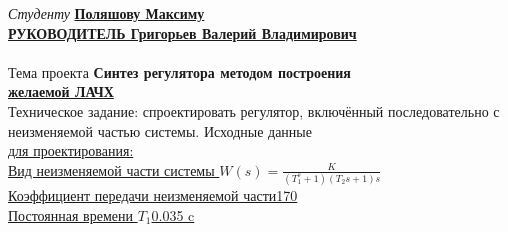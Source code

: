 \documentclass[fleqn, a4paper, 12pt, russian]{article}
\begin{document}
	\flushleft
	{\fontsize{14pt}{0cm}\selectfont \textit{Студенту} \bfseries\hspace{1cm}\underline{\hspace{5.25cm}Поляшову Максиму\hspace{9.20cm}}} \\ \vspace{0.5cm}
	{\fontsize{14pt}{0cm}\selectfont \bfseries \underline{РУКОВОДИТЕЛЬ \hspace{3.17cm} Григорьев Валерий Владимирович\hspace{1cm}}}\\ \vspace{0.3cm}
	\underline{\hspace{\textwidth}} \\ \vspace{0.3cm}
	{\fontsize{14pt}{0cm}\hspace{0.5cm}Тема проекта \hspace{1cm}\bfseries Синтез регулятора методом построения\\ \underline{\hspace{4.8cm}желаемой ЛАЧХ\hspace{8.25cm}}} \\ \vspace{0.3cm}
	{\fontsize{14pt}{0cm}\hspace{0.5cm}Техническое задание: спроектировать регулятор, включённый последовательно с неизменяемой частью системы. Исходные данные\\ \underline{для проектирования:\hspace{12.4cm}}} \\ \vspace{0.2cm}
	{\fontsize{14pt}{0cm}\selectfont \underline{Вид неизменяемой части системы \hspace{3cm}$W(s) = \displaystyle{\frac{K}{(T_1^s+1)(T_2s+1)s}}$\hspace{0.2cm}}} \\ \vspace{0.2cm}
	{\fontsize{14pt}{0cm}\selectfont \underline{Коэффициент передачи неизменяемой части\hspace{5.8cm}170\hspace{0.7cm}}} \\ \vspace{0.2cm}
	{\fontsize{14pt}{0cm}\selectfont \underline{Постоянная времени $T_1$\hspace{10.1cm}0.035 c\hspace{0.4cm}}} \\ \vspace{0.2cm}
\end{document}
